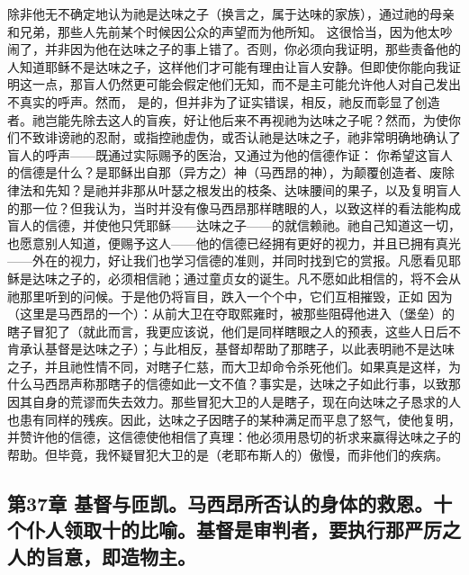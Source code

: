 除非他无不确定地认为祂是达味之子（换言之，属于达味的家族），通过祂的母亲和兄弟，那些人先前某个时候因公众的声望而为他所知。 这很恰当，因为他太吵闹了，并非因为他在达味之子的事上错了。否则，你必须向我证明，那些责备他的人知道耶稣不是达味之子，这样他们才可能有理由让盲人安静。但即使你能向我证明这一点，那盲人仍然更可能会假定他们无知，而不是主可能允许他人对自己发出不真实的呼声。然而， 是的，但并非为了证实错误，相反，祂反而彰显了创造者。祂岂能先除去这人的盲疾，好让他后来不再视祂为达味之子呢？然而，为使你们不致诽谤祂的忍耐，或指控祂虚伪，或否认祂是达味之子，祂非常明确地确认了盲人的呼声——既通过实际赐予的医治，又通过为他的信德作证： 你希望这盲人的信德是什么？是耶稣出自那（异方之）神（马西昂的神），为颠覆创造者、废除律法和先知？是祂并非那从叶瑟之根发出的枝条、达味腰间的果子，以及复明盲人的那一位？但我认为，当时并没有像马西昂那样瞎眼的人，以致这样的看法能构成盲人的信德，并使他只凭耶稣——达味之子——的就信赖祂。祂自己知道这一切，也愿意别人知道，便赐予这人——他的信德已经拥有更好的视力，并且已拥有真光——外在的视力，好让我们也学习信德的准则，并同时找到它的赏报。凡愿看见耶稣是达味之子的，必须相信祂；通过童贞女的诞生。凡不愿如此相信的，将不会从祂那里听到的问候。于是他仍将盲目，跌入一个个中，它们互相摧毁，正如 因为（这里是马西昂的一个）：从前大卫在夺取熙雍时，被那些阻碍他进入（堡垒）的瞎子冒犯了（就此而言，我更应该说，他们是同样瞎眼之人的预表，这些人日后不肯承认基督是达味之子）；与此相反，基督却帮助了那瞎子，以此表明祂不是达味之子，并且祂性情不同，对瞎子仁慈，而大卫却命令杀死他们。如果真是这样，为什么马西昂声称那瞎子的信德如此一文不值？事实是，达味之子如此行事，以致那因其自身的荒谬而失去效力。那些冒犯大卫的人是瞎子，现在向达味之子恳求的人也患有同样的残疾。因此，达味之子因瞎子的某种满足而平息了怒气，使他复明，并赞许他的信德，这信德使他相信了真理：他必须用恳切的祈求来赢得达味之子的帮助。但毕竟，我怀疑冒犯大卫的是（老耶布斯人的）傲慢，而非他们的疾病。\par


\subsection{第37章 基督与匝凯。马西昂所否认的身体的救恩。十个仆人领取十的比喻。基督是审判者，要执行那严厉之人的旨意，即造物主。}

